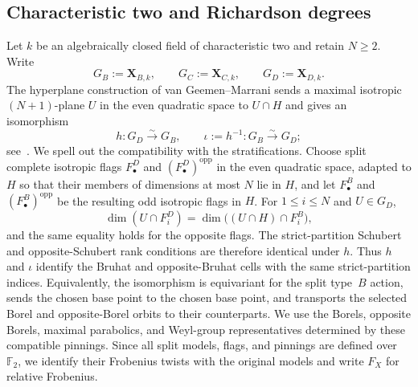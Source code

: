 \documentclass[11pt,a4paper,oneside]{amsart}
\numberwithin{equation}{section}
\theoremstyle{definition}
\theoremstyle{remark}
\begin{document}
\subsection{Characteristic two and Richardson degrees}
\label{appA:characteristic-two}

Let $k$ be an algebraically closed field of characteristic two and retain
$N\geq2$.  Write
\[
 G_B:=\mathbf X_{B,k},\qquad
 G_C:=\mathbf X_{C,k},\qquad
 G_D:=\mathbf X_{D,k}.
\]
The hyperplane construction of van Geemen--Marrani sends a maximal
isotropic $(N+1)$-plane $U$ in the even quadratic space to $U\cap H$ and
gives an isomorphism
\begin{equation}
\label{appA:eq:odd-even-char2}
 h:G_D\xrightarrow{\sim}G_B,
 \qquad
 \iota:=h^{-1}:G_B\xrightarrow{\sim}G_D;
\end{equation}
see~\cite[\S5.2]{VGM19}.  We spell out the compatibility with the
stratifications.  Choose split complete isotropic flags
$F_\bullet^D$ and $(F_\bullet^D)^{\mathrm{opp}}$ in the even quadratic space,
adapted to $H$ so that their members of dimensions at most $N$ lie in $H$,
and let $F_\bullet^B$ and $(F_\bullet^B)^{\mathrm{opp}}$ be the resulting
odd isotropic flags in $H$.  For $1\leq i\leq N$ and $U\in G_D$,
\[
 \dim(U\cap F_i^D)
 =\dim\bigl((U\cap H)\cap F_i^B\bigr),
\]
and the same equality holds for the opposite flags.  The strict-partition
Schubert and opposite-Schubert rank conditions are therefore identical
under $h$.  Thus $h$ and $\iota$ identify the Bruhat and opposite-Bruhat
cells with the same strict-partition indices.  Equivalently, the
isomorphism is equivariant for the split type~$B$ action, sends the chosen
base point to the chosen base point, and transports the selected Borel and
opposite-Borel orbits to their counterparts.  We use the Borels, opposite
Borels, maximal parabolics, and Weyl-group representatives determined by
these compatible pinnings.  Since all split models, flags, and pinnings are
defined over $\mathbb F_2$, we identify their Frobenius twists with the
original models and write $F_X$ for relative Frobenius.
\end{document}
